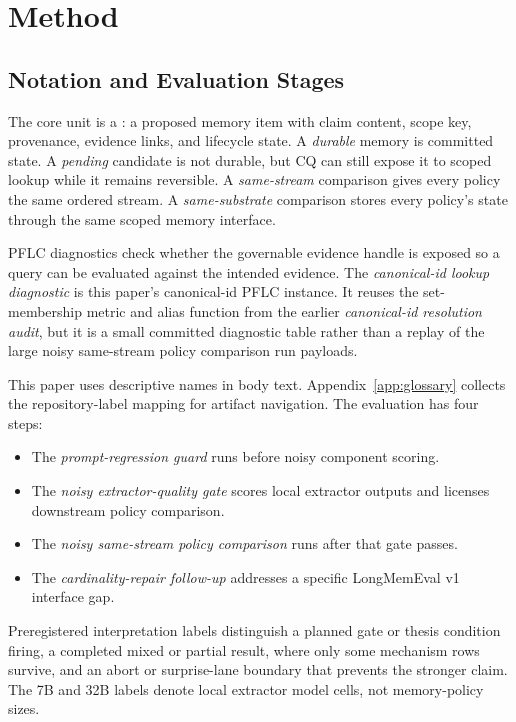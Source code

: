 \section{Method}

\subsection{Notation and Evaluation Stages}

The core unit is a : a proposed memory item with claim
content, scope key, provenance, evidence links, and lifecycle state. A
\emph{durable} memory is committed state. A \emph{pending} candidate is not
durable, but CQ can still expose it to scoped lookup while it remains
reversible. A \emph{same-stream} comparison gives every policy the same ordered
 stream. A \emph{same-substrate} comparison stores every
policy's state through the same scoped memory interface.

PFLC diagnostics check whether the governable evidence handle is exposed so a
query can be evaluated against the intended evidence. The \emph{canonical-id
lookup diagnostic} is this paper's canonical-id PFLC instance. It reuses the
set-membership metric and alias function from the
earlier \emph{canonical-id resolution audit}, but it is a small committed
diagnostic table rather than a replay of the large noisy same-stream policy
comparison run payloads.

This paper uses descriptive names in body text. Appendix~\ref{app:glossary}
collects the repository-label mapping for artifact navigation. The evaluation
has four steps:
\begin{itemize}
\item The \emph{prompt-regression guard} runs before noisy component scoring.
\item The \emph{noisy extractor-quality gate} scores local extractor outputs
and licenses downstream policy comparison.
\item The \emph{noisy same-stream policy comparison} runs after that gate
passes.
\item The \emph{cardinality-repair follow-up} addresses a specific
LongMemEval v1 interface gap.
\end{itemize}
Preregistered interpretation labels distinguish a planned gate or thesis
condition firing, a completed mixed or partial result, where only some mechanism
rows survive, and an abort or surprise-lane boundary that prevents the stronger
claim. The 7B and 32B labels denote local extractor model cells, not
memory-policy sizes.

